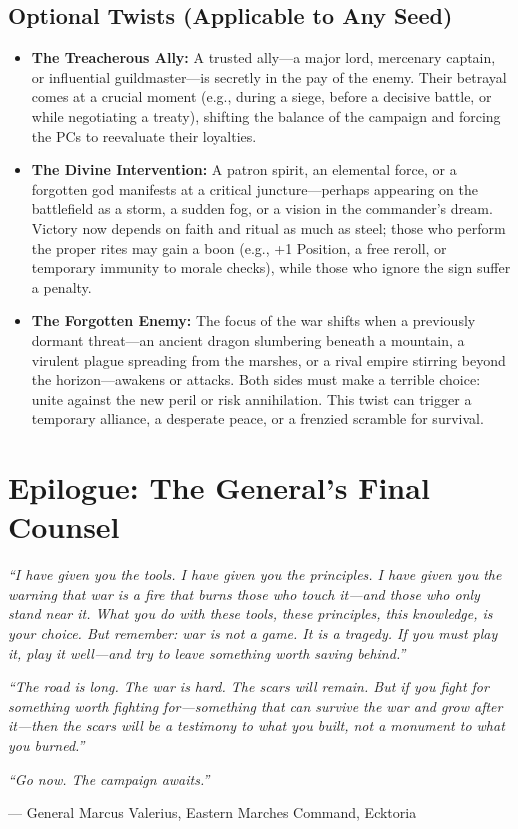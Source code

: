\documentclass[11pt]{article}
\begin{document}
\subsection{Optional Twists (Applicable to Any Seed)}
\begin{itemize}
    \item \textbf{The Treacherous Ally:} A trusted ally—a major lord, mercenary captain, or influential guildmaster—is secretly in the pay of the enemy. Their betrayal comes at a crucial moment (e.g., during a siege, before a decisive battle, or while negotiating a treaty), shifting the balance of the campaign and forcing the PCs to reevaluate their loyalties.
    \item \textbf{The Divine Intervention:} A patron spirit, an elemental force, or a forgotten god manifests at a critical juncture—perhaps appearing on the battlefield as a storm, a sudden fog, or a vision in the commander's dream. Victory now depends on faith and ritual as much as steel; those who perform the proper rites may gain a boon (e.g., +1 Position, a free reroll, or temporary immunity to morale checks), while those who ignore the sign suffer a penalty.
    \item \textbf{The Forgotten Enemy:} The focus of the war shifts when a previously dormant threat—an ancient dragon slumbering beneath a mountain, a virulent plague spreading from the marshes, or a rival empire stirring beyond the horizon—awakens or attacks. Both sides must make a terrible choice: unite against the new peril or risk annihilation. This twist can trigger a temporary alliance, a desperate peace, or a frenzied scramble for survival.
\end{itemize}

\section{Epilogue: The General's Final Counsel}

\textit{``I have given you the tools. I have given you the principles. I have given you the warning that war is a fire that burns those who touch it—and those who only stand near it. What you do with these tools, these principles, this knowledge, is your choice. But remember: war is not a game. It is a tragedy. If you must play it, play it well—and try to leave something worth saving behind.''}

\textit{``The road is long. The war is hard. The scars will remain. But if you fight for something worth fighting for—something that can survive the war and grow after it—then the scars will be a testimony to what you built, not a monument to what you burned.''}

\textit{``Go now. The campaign awaits.''}

\noindent— General Marcus Valerius, Eastern Marches Command, Ecktoria
\end{document}
